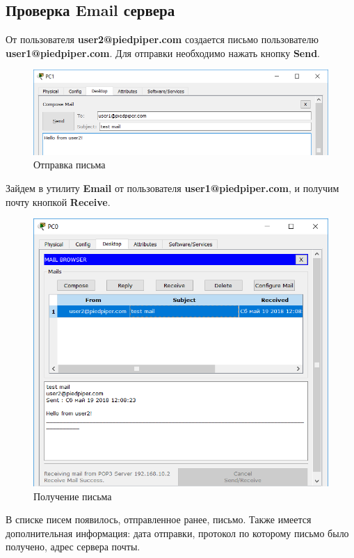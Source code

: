 \subsection{Проверка Email сервера}
От пользователя \textbf{user2@piedpiper.com} создается письмо пользователю \textbf{user1@piedpiper.com}. Для отправки необходимо нажать кнопку \textbf{Send}.
\begin{figure}[H]
  \centering
  \includegraphics[width=.8\textwidth]{img/test_mail__0}
  \caption{Отправка письма}
\end{figure}
Зайдем в утилиту \textbf{Email} от пользователя \textbf{user1@piedpiper.com}, и получим почту кнопкой \textbf{Receive}.
\begin{figure}[H]
  \centering
  \includegraphics[width=.75\textwidth]{img/test_mail__1}
  \caption{Получение письма}
\end{figure}
В списке писем появилось, отправленное ранее, письмо. Также имеется дополнительная информация: дата отправки, протокол по которому письмо было получено, адрес сервера почты. 

